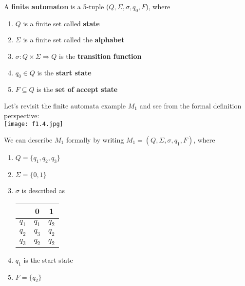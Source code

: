 \begin{definition}
    A \textbf{finite automaton} is a 5-tuple (\(Q, \Sigma, \sigma, q_0, F\)), where
    \begin{enumerate}
        \item \(Q\) is a finite set called \textbf{state} 
        \item \(\Sigma\) is a finite set called the \textbf{alphabet} 
        \item \(\sigma: Q \times \Sigma \Rightarrow Q\) is the \textbf{transition function}
        \item \(q_0 \in Q\) is the \textbf{start state}
        \item \(F \subseteq Q\) is the \textbf{set of accept state}         
    \end{enumerate}
\end{definition}

\begin{eg}
    Let's revisit the finite automata example \(M_1\) and see from the formal definition perspective: \\
    \texttt{[image: f1.4.jpg]}

    We can describe \(M_1\) formally by writing \(M_1 = (Q, \Sigma, \sigma, q_1, F)\), where   
    \begin{enumerate}
        \item \(Q = \{q_1, q_2, q_3\}\)
        \item \(\Sigma = \{ 0, 1 \} \)  
        \item \(\sigma\) is described as 
        \begin{table}[H]
            \centering
            \begin{tabular}{c|c|c}
                \toprule
                     & 0 & 1  \\
                \midrule
                   \(q_1\)  & \(q_1\)  & \(q_2\)  \\
                   \(q_2\)  & \(q_3\)  & \(q_2\)  \\
                   \(q_3\)  & \(q_2\)  & \(q_2\)  \\
                \bottomrule
            \end{tabular}
        \end{table}
        \item \(q_1\) is the start state
        \item \(F = \{ q_2 \} \)  
    \end{enumerate}
\end{eg}

